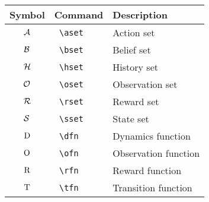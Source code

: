 \documentclass{article}
\begin{document}
\begin{tabular}{cll}
  Symbol & Command & Description \\
  \hline
  $\mathcal{A}$ & \texttt{ \textbackslash aset } & Action set \\
  $\mathcal{B}$ & \texttt{ \textbackslash bset } & Belief set \\
  $\mathcal{H}$ & \texttt{ \textbackslash hset } & History set \\
  $\mathcal{O}$ & \texttt{ \textbackslash oset } & Observation set \\
  $\mathcal{R}$ & \texttt{ \textbackslash rset } & Reward set \\
  $\mathcal{S}$ & \texttt{ \textbackslash sset } & State set \\
  $\mathrm{D}$ & \texttt{ \textbackslash dfn } & Dynamics function \\
  $\mathrm{O}$ & \texttt{ \textbackslash ofn } & Observation function \\
  $\mathrm{R}$ & \texttt{ \textbackslash rfn } & Reward function \\
  $\mathrm{T}$ & \texttt{ \textbackslash tfn } & Transition function \\
\end{tabular}
\end{document}
